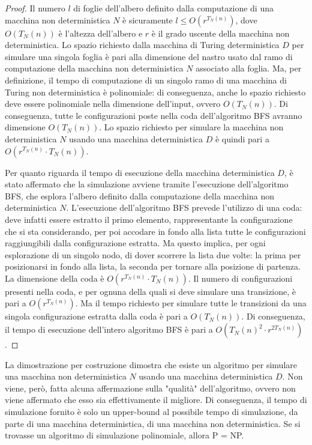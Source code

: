 \begin{proof}
    Il numero $l$ di foglie dell'albero definito dalla computazione di una
    macchina non deterministica $N$ è sicuramente $l \le O(r^{T_N(n)})$, dove
    $O(T_N(n))$ è l'altezza dell'albero e $r$ è il grado uscente della
    macchina non deterministica.
    Lo spazio richiesto dalla macchina di Turing deterministica $D$ per
    simulare una singola foglia è pari alla dimensione del nastro usato
    dal ramo di computazione della macchina non deterministica $N$ associato
    alla foglia.
    Ma, per definizione, il tempo di computazione di un singolo ramo di
    una macchina di Turing non deterministica è polinomiale: di conseguenza,
    anche lo spazio richiesto deve essere polinomiale nella dimensione
    dell'input, ovvero $O(T_N(n))$. Di conseguenza, tutte le configurazioni
    poste nella coda dell'algoritmo BFS avranno dimensione $O(T_N(n))$.
    Lo spazio richiesto per simulare la macchina non deterministica $N$
    usando una macchina deterministica $D$ è quindi pari a
    $O(r^{T_N(n)} \cdot T_N(n))$.

    Per quanto riguarda il tempo di esecuzione della macchina deterministica
    $D$, è stato affermato che la simulazione avviene tramite l'esecuzione
    dell'algoritmo BFS, che esplora l'albero definito dalla computazione
    della macchina non deterministica $N$.
    L'esecuzione dell'algoritmo BFS prevede l'utilizzo di una coda: deve
    infatti essere estratto il primo elemento, rappresentante la
    configurazione che si sta considerando, per poi accodare in fondo alla
    lista tutte le configurazioni raggiungibili dalla configurazione estratta.
    Ma questo implica, per ogni esplorazione di un singolo nodo, di dover
    scorrere la lista due volte: la prima per posizionarsi in fondo alla lista,
    la seconda per tornare alla posizione di partenza.
    La dimensione della coda è $O(r^{T_N(n)} \cdot T_N(n))$.
    Il numero di configurazioni presenti nella coda, e per ognuna della quali
    si deve simulare una transizione, è pari a $O(r^{T_N(n)})$.
    Ma il tempo richiesto per simulare tutte le transizioni da una singola
    configurazione estratta dalla coda è pari a $O(T_N(n))$.
    Di conseguenza, il tempo di esecuzione dell'intero algoritmo BFS è pari a
    $O({T_N(n)}^2 \cdot r^{2T_N(n)})$.
\end{proof}
\begin{rem}
    La dimostrazione per costruzione dimostra che esiste un algoritmo per
    simulare una macchina non deterministica $N$ usando una macchina
    deterministica $D$. Non viene, però, fatta alcuna affermazione sulla
    "qualità" dell'algoritmo, ovvero non viene affermato che esso sia
    effettivamente il migliore. Di conseguenza, il tempo di simulazione
    fornito è solo un upper-bound al possibile tempo di simulazione, da
    parte di una macchina deterministica, di una macchina non deterministica.
    Se si trovasse un algoritmo di simulazione polinomiale, allora P = NP.
\end{rem}

